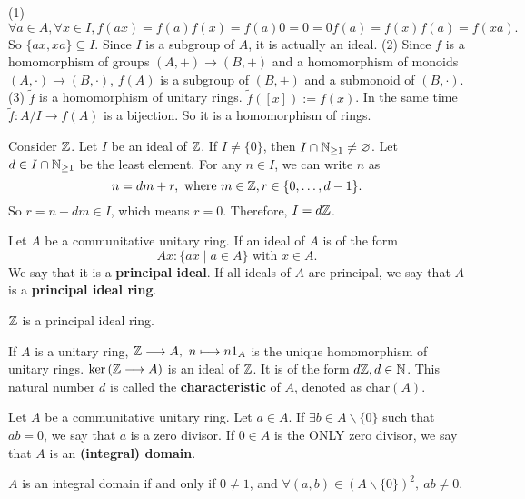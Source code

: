 \begin{proofenv}
    \quad \newline
    (1) $$\forall a\in A,\forall x\in I, f(ax)=f(a)f(x)=f(a)0=0=0f(a)=f(x)f(a)=f(xa).$$
    So $\{ax,xa\}\subseteq I$. Since $I$ is a subgroup of $A$, it is actually an ideal.
    \newline
    (2) Since $f$ is a homomorphism of groups $(A,+)\longrightarrow(B,+)$ and a homomorphism of monoids $(A,\cdot)\longrightarrow(B,\cdot)$, $f(A)$ is a subgroup of $(B,+)$ and a submonoid of $(B,\cdot)$.
    \newline
    (3) $\tilde{f}$ is a homomorphism of unitary rings. $\tilde{f}([x]):=f(x)$. In the same time $\tilde{f}:A/I\longrightarrow f(A)$ is a bijection. So it is a homomorphism of rings.
\end{proofenv}
\begin{exampleenv}
    Consider $\mathbb{Z}$. Let $I$ be an ideal of $\mathbb{Z}$. If $I\not=\{0\}$, then $I\cap\mathbb{N}_{\ge1}\not=\varnothing$. Let $d\in I\cap\mathbb{N}_{\ge1}$ be the least element. For any $n\in I$, we can write $n$ as 
    $$n=dm+r,\text{ where }m\in\mathbb{Z},r\in \{0,\dots,d-1\}.$$
    So $r=n-dm\in I$, which means $r=0$. Therefore, $I=d\mathbb{Z}$.
\end{exampleenv}
\begin{definitionenv}
    Let $A$ be a communitative unitary ring. If an ideal of $A$ is of the form 
    $$Ax:\{ax\mid a\in A\}\text{ with }x\in A.$$
    We say that it is a \textbf{principal ideal}. If all ideals of $A$ are principal, we say that $A$ is a \textbf{principal ideal ring}. 
\end{definitionenv}
\begin{exampleenv}
    $\mathbb{Z}$ is a principal ideal ring.
\end{exampleenv}
\begin{remark}
    If $A$ is a unitary ring, $\ZZ\longrightarrow A,\ n\longmapsto n1_A$ is the unique homomorphism of unitary rings. $\ker\left(\mathbb{Z}\longrightarrow A\right)$ is an ideal of $\mathbb{Z}$. It is of the form $d\mathbb{Z},d\in \mathbb{N}$. This natural number $d$ is called the \textbf{characteristic} of $A$, denoted as $\mathrm{char}(A)$.
\end{remark}
\begin{definitionenv}
    Let $A$ be a communitative unitary ring. Let $a\in A$. If $\exists b\in A\backslash\{0\}$ such that $ab=0$, we say that $a$ is a zero divisor. If $0\in A$ is the ONLY zero divisor, we say that $A$ is an \textbf{(integral) domain}.
\end{definitionenv}
\begin{box2}
    $A$ is an integral domain if and only if $0\not=1$, and $\forall(a,b)\in \left(A\backslash\{0\}\right)^2,\ ab\not=0$.
\end{box2}

